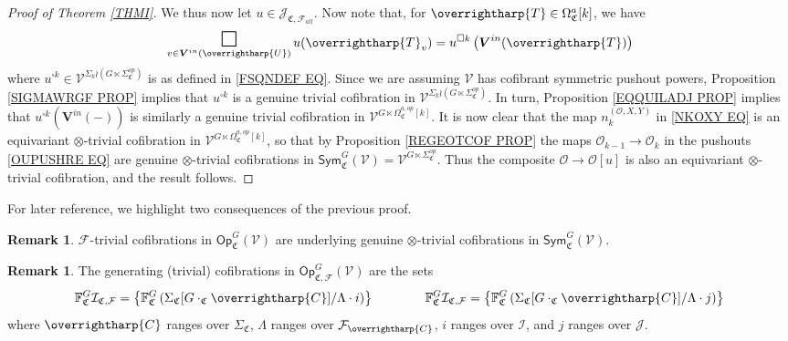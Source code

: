 \documentclass[a4paper,10pt
]{article}%
\numberwithin{equation}{section}
\numberwithin{figure}{section}
\theoremstyle{definition} %
\newtheorem{remark}[equation]{Remark}%
\newcommand{\vect}[1]{\text{\overrightharp{\ensuremath{#1}}}}
\newcommand{\Op}{\mathsf{Op}}%
\newcommand{\F}{\ensuremath{\mathcal F}}
\newcommand{\V}{\ensuremath{\mathcal V}}
\renewcommand{\O}{\ensuremath{\mathcal O}}
\newcommand{\1}{\ensuremath{\mathbbm 1}}%
\begin{document}
\begin{proof}[Proof of Theorem \ref{THMI}]
	We thus now let 
	$u \in \mathcal{J}_{\mathfrak{C},\mathcal{F}_{all}}$.
	Now note that, for $\vect{T} \in \Omega^a_{\mathfrak{C}}[k]$,
	we have
	\[
	\mathop{\mathlarger{\mathlarger{\mathlarger{\square}}}}\limits_{v \in \boldsymbol{V}^{in}(\vect{U})} u(\vect{T}_v)
	=
	u^{\square k}\left( \boldsymbol{V}^{in}(\vect T) \right)
	\]
	where
	$u^{\square k} \in 
	\V^{\Sigma_k \wr (G \ltimes \Sigma^{op}_{\mathfrak{C}})}$
	is as defined in \eqref{FSQNDEF EQ}.
	Since we are assuming $\V$ has cofibrant symmetric pushout powers,
        Proposition \ref{SIGMAWRGF PROP} implies that
	$u^{\square k}$ is a genuine trivial cofibration in 
	$\V^{\Sigma_k \wr (G \ltimes \Sigma^{op}_{\mathfrak{C}})}$.
	In turn,
	Proposition \ref{EQQUILADJ PROP} implies that
	$u^{\square k}(\boldsymbol{V}^{in}(-))$
	is similarly a genuine trivial cofibration in 
	$\V^{G \ltimes \Omega^{a,op}_{\mathfrak{C}}[k]}$.
	It is now clear that
	the map $n_k^{(\O,X,Y)}$ in \eqref{NKOXY EQ}
	is an equivariant
	$\otimes$-trivial cofibration in 
	$\V^{G \ltimes \Omega^{a,op}_{\mathfrak{C}}[k]}$,
	so that by 
	Proposition \ref{REGEOTCOF PROP}
	the maps $\O_{k-1} \to \O_{k}$
	in the pushouts \eqref{OUPUSHRE EQ}
	are genuine $\otimes$-trivial cofibrations
	in 
	$\mathsf{Sym}^G_{\mathfrak{C}}(\V)
	= \V^{G\ltimes \Sigma^{op}_{\mathfrak{C}}}$.
	Thus the composite $\O \to \O[u]$
	is also an
	equivariant $\otimes$-trivial cofibration,
	and the result follows.
\end{proof}




For later reference, 
we highlight two consequences of the previous proof.


\begin{remark}\label{GOTC_REM}
	$\F$-trivial cofibrations in $\Op^G_{\mathfrak C}(\V)$ are underlying genuine $\otimes$-trivial cofibrations
	in $\mathsf{Sym}^G_{\mathfrak C}(\V)$.
\end{remark}

\begin{remark}\label{FVGSIGF REM}
	The generating (trivial) cofibrations in
	$\mathsf{Op}^G_{\mathfrak{C},\F}(\V)$
	are the sets
	\begin{equation}\label{FVGSIGF EQ}
	\mathbb{F}^G_{\mathfrak{C}}\mathcal{I}_{\mathfrak{C},\mathcal{F}}
	=
	\left\{
	\mathbb{F}^G_{\mathfrak{C}}
	\left(\Sigma_{\mathfrak{C}}[G \cdot_{\mathfrak{C}} \vect{C}]/\Lambda \cdot i \right)
	\right\}
	\qquad \qquad
	\mathbb{F}^G_{\mathfrak{C}}\mathcal{I}_{\mathfrak{C},\mathcal{F}}
	=
	\left\{
	\mathbb{F}^G_{\mathfrak{C}}
	\left(\Sigma_{\mathfrak{C}}[G \cdot_{\mathfrak{C}} \vect{C}]/\Lambda \cdot j \right)
	\right\}
	\end{equation}
	where $\vect{C}$ ranges over $\Sigma_{\mathfrak{C}}$,
	$\Lambda$ ranges over $\F_{\vect{C}}$,
	$i$ ranges over $\mathcal{I}$,
	and $j$ ranges over $\mathcal{J}$.
\end{remark}
\end{document}
